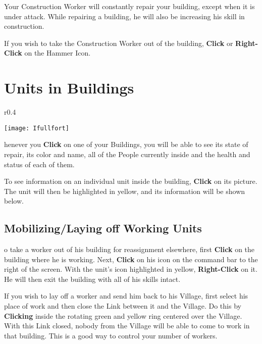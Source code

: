 Your Construction Worker will constantly repair your building, except when it is under attack. While repairing a building, he will also be increasing his skill in construction.

If you wish to take the Construction Worker out of the building, \textbf{Click} or \textbf{Right-Click} on the Hammer Icon.

\section{\textsf{Units in Buildings}}


\begin{wrapfigure}{r}{0.4\textwidth}
    \vspace{-20pt}
    \begin{center}
        \texttt{[image: Ifullfort]} %
    \end{center}
    \vspace{-10pt}
\end{wrapfigure}

henever you \textbf{Click} on one of your Buildings, you will be able to see its state of repair, its color and name, all of the People currently inside and the health and status of each of them.

To see information on an individual unit inside the building, \textbf{Click} on its picture. The unit will then be highlighted in yellow, and its information will be shown below.

\subsection{\textsf{Mobilizing/Laying off Working Units}}


o take a worker out of his building for reassignment elsewhere, first \textbf{Click} on the building where he is working. Next, \textbf{Click} on his icon on the command bar to the right of the screen. With the unit’s icon highlighted in yellow, \textbf{Right-Click} on it. He will then exit the building with all of his skills intact.


If you wish to lay off a worker and send him back to his Village, first select his place of work and then close the Link between it and the Village. Do this by \textbf{Clicking} inside the rotating green and yellow ring centered over the Village. With this Link closed, nobody from the Village will be able to come to work in that building. This is a good way to control your number of workers.

